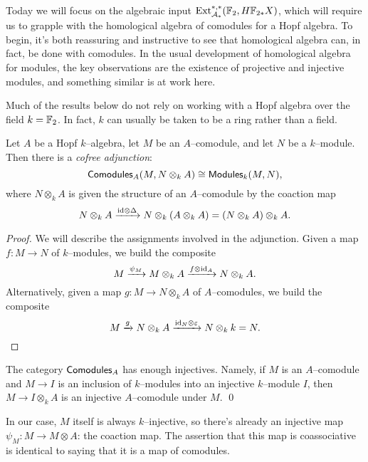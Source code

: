 Today we will focus on the algebraic input $\operatorname{Ext}_{\mathcal A_*}^{*, *}(\mathbb F_2, H\mathbb F_{2*} X)$, which will require us to grapple with the homological algebra of comodules for a Hopf algebra.  To begin, it's both reassuring and instructive to see that homological algebra can, in fact, be done with comodules.  In the usual development of homological algebra for modules, the key observations are the existence of projective and injective modules, and something similar is at work here.

\begin{remark}
Much of the results below do not rely on working with a Hopf algebra over the field $k = \mathbb F_2$.  In fact, $k$ can usually be taken to be a ring rather than a field.
\end{remark}

\begin{lemma}
Let $A$ be a Hopf $k$--algebra, let $M$ be an $A$--comodule, and let $N$ be a $k$--module.  Then there is a \textit{cofree adjunction}: \[\mathsf{Comodules}_A(M, N \otimes_k A) \cong \mathsf{Modules}_k(M, N),\] where $N \otimes_k A$ is given the structure of an $A$--comodule by the coaction map \[N \otimes_k A \xrightarrow{\mathrm{id} \otimes \Delta} N \otimes_k (A \otimes_k A) = (N \otimes_k A) \otimes_k A.\]
\end{lemma}
\begin{proof}
We will describe the assignments involved in the adjunction.  Given a map $f: M \to N$ of $k$--modules, we build the composite \[M \xrightarrow{\psi_M} M \otimes_k A \xrightarrow{f \otimes \mathrm{id}_A} N \otimes_k A.\]  Alternatively, given a map $g: M \to N \otimes_k A$ of $A$--comodules, we build the composite \[M \xrightarrow{g} N \otimes_k A \xrightarrow{\mathrm{id}_N \otimes \varepsilon} N \otimes_k k = N. \qedhere\]
\end{proof}

\begin{corollary}
The category $\mathsf{Comodules}_A$ has enough injectives.  Namely, if $M$ is an $A$--comodule and $M \to I$ is an inclusion of $k$--modules into an injective $k$--module $I$, then $M \to I \otimes_k A$ is an injective $A$--comodule under $M$. \qed
\end{corollary}
\begin{remark}
In our case, $M$ itself is always $k$--injective, so there's already an injective map $\psi_M: M \to M \otimes A$: the coaction map.  The assertion that this map is coassociative is identical to saying that it is a map of comodules.
\end{remark}

